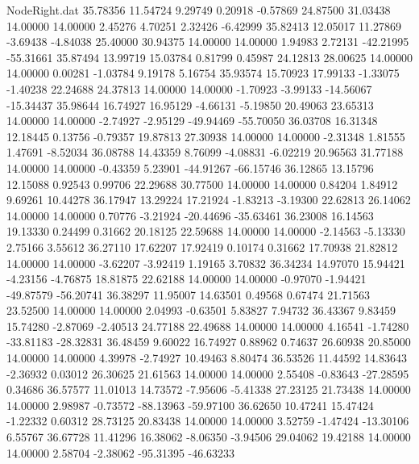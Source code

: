 \begin{filecontents}{NodeRight.dat}
  35.78356   11.54724    9.29749     0.20918   -0.57869   24.87500   31.03438   14.00000   14.00000    2.45276    4.70251    2.32426   -6.42999
  35.82413   12.05017   11.27869    -3.69438   -4.84038   25.40000   30.94375   14.00000   14.00000    1.94983    2.72131  -42.21995  -55.31661
  35.87494   13.99719   15.03784     0.81799    0.45987   24.12813   28.00625   14.00000   14.00000    0.00281   -1.03784    9.19178    5.16754
  35.93574   15.70923   17.99133    -1.33075   -1.40238   22.24688   24.37813   14.00000   14.00000   -1.70923   -3.99133  -14.56067  -15.34437
  35.98644   16.74927   16.95129    -4.66131   -5.19850   20.49063   23.65313   14.00000   14.00000   -2.74927   -2.95129  -49.94469  -55.70050
  36.03708   16.31348   12.18445     0.13756   -0.79357   19.87813   27.30938   14.00000   14.00000   -2.31348    1.81555    1.47691   -8.52034
  36.08788   14.43359    8.76099    -4.08831   -6.02219   20.96563   31.77188   14.00000   14.00000   -0.43359    5.23901  -44.91267  -66.15746
  36.12865   13.15796   12.15088     0.92543    0.99706   22.29688   30.77500   14.00000   14.00000    0.84204    1.84912    9.69261   10.44278
  36.17947   13.29224   17.21924    -1.83213   -3.19300   22.62813   26.14062   14.00000   14.00000    0.70776   -3.21924  -20.44696  -35.63461
  36.23008   16.14563   19.13330     0.24499    0.31662   20.18125   22.59688   14.00000   14.00000   -2.14563   -5.13330    2.75166    3.55612
  36.27110   17.62207   17.92419     0.10174    0.31662   17.70938   21.82812   14.00000   14.00000   -3.62207   -3.92419    1.19165    3.70832
  36.34234   14.97070   15.94421    -4.23156   -4.76875   18.81875   22.62188   14.00000   14.00000   -0.97070   -1.94421  -49.87579  -56.20741
  36.38297   11.95007   14.63501     0.49568    0.67474   21.71563   23.52500   14.00000   14.00000    2.04993   -0.63501    5.83827    7.94732
  36.43367    9.83459   15.74280    -2.87069   -2.40513   24.77188   22.49688   14.00000   14.00000    4.16541   -1.74280  -33.81183  -28.32831
  36.48459    9.60022   16.74927     0.88962    0.74637   26.60938   20.85000   14.00000   14.00000    4.39978   -2.74927   10.49463    8.80474
  36.53526   11.44592   14.83643    -2.36932    0.03012   26.30625   21.61563   14.00000   14.00000    2.55408   -0.83643  -27.28595    0.34686
  36.57577   11.01013   14.73572    -7.95606   -5.41338   27.23125   21.73438   14.00000   14.00000    2.98987   -0.73572  -88.13963  -59.97100
  36.62650   10.47241   15.47424    -1.22332    0.60312   28.73125   20.83438   14.00000   14.00000    3.52759   -1.47424  -13.30106    6.55767
  36.67728   11.41296   16.38062    -8.06350   -3.94506   29.04062   19.42188   14.00000   14.00000    2.58704   -2.38062  -95.31395  -46.63233

\end{filecontents}

